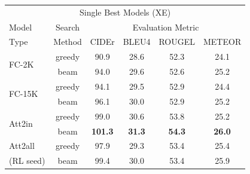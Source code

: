 \documentclass[10pt,twocolumn,letterpaper]{article}
\begin{document}
\begin{table}[th]
\small\addtolength{\tabcolsep}{-2pt} 
\begin{tabular}{l|c|cccc}
\hline \hline
\multicolumn{6}{c}{\multirow{2}{*}{Single Best Models (XE)}} \\
\multicolumn{6}{c}{}\\
\hline
Model &  Search & \multicolumn{4}{c}{Evaluation Metric} \\
  Type & Method & CIDEr & BLEU4 & ROUGEL & METEOR  \\
\hline
\multirow{2}{*}{FC-2K}   & greedy & 90.9 & 28.6 & 52.3 & 24.1  \\ %
& beam & 94.0 & 29.6 & 52.6 & 25.2 \\ %
\hline
\multirow{2}{*}{FC-15K} & greedy & 94.1  & 29.5  & 52.9  & 24.4  \\ %
				   & beam & 96.1  & 30.0  & 52.9  & 25.2  \\ %
\hline
\multirow{2}{*}{Att2in} & greedy & 99.0 & 30.6 & 53.8 & 25.2  \\ %
& beam & {\bf 101.3} & {\bf 31.3} & {\bf 54.3} &{\bf  26.0}  \\ %
\hline
{Att2all} & greedy & 97.9 & 29.3 & 53.4 & 25.4 \\
(RL seed) & beam & 99.4 & 30.0 & 53.4 & 25.9 \\


\end{tabular}
\end{table}
\end{document}
